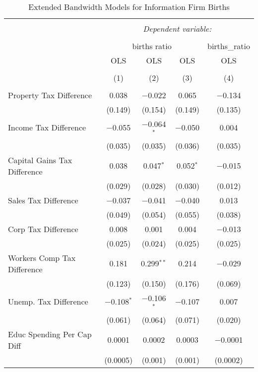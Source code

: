 
\begin{table}[!htbp] \centering 
  \caption{Extended Bandwidth Models for  Information Firm Births} 
  \label{51eb} 
\begin{tabular}{@{\extracolsep{5pt}}lcccc} 
\\[-1.8ex]\hline 
\hline \\[-1.8ex] 
 & \multicolumn{4}{c}{\textit{Dependent variable:}} \\ 
\cline{2-5} 
\\[-1.8ex] & \multicolumn{3}{c}{births ratio} & births\_ratio \\ 
 & OLS & OLS & OLS & OLS \\ 
\\[-1.8ex] & (1) & (2) & (3) & (4)\\ 
\hline \\[-1.8ex] 
 Property Tax Difference & 0.038 & $-$0.022 & 0.065 & $-$0.134 \\ 
  & (0.149) & (0.154) & (0.149) & (0.135) \\ 
  Income Tax Difference & $-$0.055 & $-$0.064$^{*}$ & $-$0.050 & 0.004 \\ 
  & (0.035) & (0.035) & (0.036) & (0.035) \\ 
  Capital Gains Tax Difference & 0.038 & 0.047$^{*}$ & 0.052$^{*}$ & $-$0.015 \\ 
  & (0.029) & (0.028) & (0.030) & (0.012) \\ 
  Sales Tax Difference & $-$0.037 & $-$0.041 & $-$0.040 & 0.013 \\ 
  & (0.049) & (0.054) & (0.055) & (0.038) \\ 
  Corp Tax Difference & 0.008 & 0.001 & 0.004 & $-$0.013 \\ 
  & (0.025) & (0.024) & (0.025) & (0.025) \\ 
  Workers Comp Tax Difference & 0.181 & 0.299$^{**}$ & 0.214 & $-$0.029 \\ 
  & (0.123) & (0.150) & (0.176) & (0.069) \\ 
  Unemp. Tax Difference & $-$0.108$^{*}$ & $-$0.106$^{*}$ & $-$0.107 & 0.007 \\ 
  & (0.061) & (0.064) & (0.071) & (0.020) \\ 
  Educ Spending Per Cap Diff & 0.0001 & 0.0002 & 0.0003 & $-$0.0001 \\ 
  & (0.0005) & (0.001) & (0.001) & (0.0002) \\ 

\end{tabular}
\end{table}
